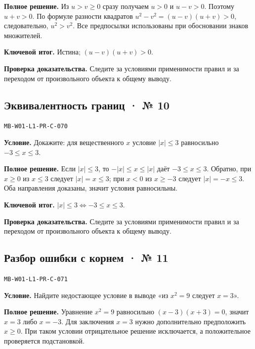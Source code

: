 \documentclass[11pt,a4paper,openany]{book}
\newcommand{\muid}[1]{\texttt{\footnotesize #1}}
\begin{document}
\textbf{Полное решение.} Из $u>v\ge0$ сразу получаем $u>0$ и $u-v>0$. Поэтому $u+v>0$. По формуле разности квадратов $u^2-v^2=(u-v)(u+v)>0$, следовательно, $u^2>v^2$. Все предпосылки использованы при обосновании знаков множителей.


\begin{learnbox}\textbf{Ключевой итог.} Истина; $(u-v)(u+v)>0$.\par \textbf{Проверка доказательства.} 
Следите за условиями применимости правил и за переходом от произвольного объекта к общему выводу. 
\end{learnbox}

\subsection*{Эквивалентность границ · № 10}\hypertarget{solution:MB-W01-L1-PR-C-070}{}

\muid{MB-W01-L1-PR-C-070}\par

\textbf{Условие.} Докажите: для вещественного $x$ условие $|x|\le3$ равносильно $-3\le x\le3$.\par

\textbf{Полное решение.} Если $|x|\le3$, то $-\lvert x\rvert\le x\le\lvert x\rvert$ даёт $-3\le x\le3$. Обратно, при $x\ge0$ из $x\le3$ следует $|x|=x\le3$; при $x<0$ из $x\ge-3$ следует $|x|=-x\le3$. Оба направления доказаны, значит условия равносильны.


\begin{learnbox}\textbf{Ключевой итог.} $|x|\le3\Leftrightarrow-3\le x\le3$.\par \textbf{Проверка доказательства.} 
Следите за условиями применимости правил и за переходом от произвольного объекта к общему выводу. 
\end{learnbox}

\subsection*{Разбор ошибки с корнем · № 11}\hypertarget{solution:MB-W01-L1-PR-C-071}{}

\muid{MB-W01-L1-PR-C-071}\par

\textbf{Условие.} Найдите недостающее условие в выводе «из $x^2=9$ следует $x=3$».\par

\textbf{Полное решение.} Уравнение $x^2=9$ равносильно $(x-3)(x+3)=0$, значит $x=3$ либо $x=-3$. Для заключения $x=3$ нужно дополнительно предположить $x\ge0$. При таком условии отрицательное решение исключается, а положительное проверяется подстановкой.
\end{document}
